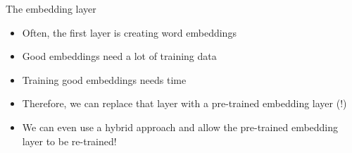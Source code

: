 \begin{frame}{The embedding layer}
  \begin{itemize}
  \item Often, the first layer is creating word embeddings
  \item Good embeddings need a lot of training data
  \item Training good embeddings needs time
  \item Therefore, we can replace that layer with a pre-trained embedding layer (!)
  \item We can even use a hybrid approach and allow the pre-trained embedding layer to be re-trained!
  \end{itemize}
\end{frame}


